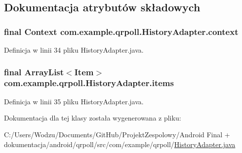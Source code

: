 \subsection{Dokumentacja atrybutów składowych}
\hypertarget{classcom_1_1example_1_1qrpoll_1_1_history_adapter_a118ff9b19fe9e292e2a60fc5b42150f9}{
\subsubsection[{context}]{\setlength{\rightskip}{0pt plus 5cm}final Context com.\+example.\+qrpoll.\+History\+Adapter.\+context\hspace{0.3cm}{\ttfamily [private]}}}\label{classcom_1_1example_1_1qrpoll_1_1_history_adapter_a118ff9b19fe9e292e2a60fc5b42150f9}


Definicja w linii 34 pliku History\+Adapter.\+java.

\hypertarget{classcom_1_1example_1_1qrpoll_1_1_history_adapter_adc0f747e0409d63449e90738b935ce1d}{
\subsubsection[{items}]{\setlength{\rightskip}{0pt plus 5cm}final Array\+List$<${\bf Item}$>$ com.\+example.\+qrpoll.\+History\+Adapter.\+items\hspace{0.3cm}{\ttfamily [private]}}}\label{classcom_1_1example_1_1qrpoll_1_1_history_adapter_adc0f747e0409d63449e90738b935ce1d}


Definicja w linii 35 pliku History\+Adapter.\+java.



Dokumentacja dla tej klasy została wygenerowana z pliku\+:\begin{DoxyCompactItemize}
\item 
C\+:/\+Users/\+Wodzu/\+Documents/\+Git\+Hub/\+Projekt\+Zespolowy/\+Android Final + dokumentacja/android/qrpoll/src/com/example/qrpoll/\hyperlink{_history_adapter_8java}{History\+Adapter.\+java}\end{DoxyCompactItemize}
